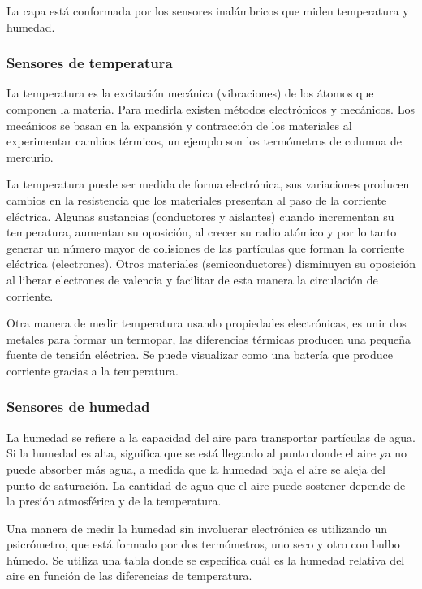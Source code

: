 		La capa está conformada por los sensores inalámbricos que miden temperatura y humedad.
		
		\subsubsection{Sensores de temperatura}
		
			La temperatura es la excitación mecánica (vibraciones) de los átomos que componen la materia. Para medirla existen métodos electrónicos y mecánicos. Los mecánicos se basan en la expansión y contracción de los materiales al experimentar cambios térmicos, un ejemplo son los termómetros de columna de mercurio.
		
			La temperatura puede ser medida de forma electrónica, sus variaciones producen cambios en la resistencia que los materiales presentan al paso de la corriente eléctrica. Algunas sustancias (conductores y aislantes) cuando incrementan su temperatura, aumentan su oposición, al crecer su radio atómico y por lo tanto generar un número mayor de colisiones de las partículas que forman la corriente eléctrica (electrones). Otros materiales (semiconductores) disminuyen su oposición al liberar electrones de valencia y facilitar de esta manera la circulación de corriente.
		
			Otra manera de medir temperatura usando propiedades electrónicas, es unir dos metales para formar un termopar, las diferencias térmicas producen una pequeña fuente de tensión eléctrica. Se puede visualizar como una batería que produce corriente gracias a la temperatura.
		
		\subsubsection{Sensores de humedad}
		
			La humedad se refiere a la capacidad del aire para transportar partículas de agua. Si la humedad es alta, significa que se está llegando al punto donde el aire ya no puede absorber más agua, a medida que la humedad baja el aire se aleja del punto de saturación. La cantidad de agua que el aire puede sostener depende de la presión atmosférica y de la temperatura.
		
			Una manera de medir la humedad sin involucrar electrónica es utilizando un psicrómetro, que está formado por dos termómetros, uno seco y otro con bulbo húmedo. Se utiliza una tabla donde se especifica cuál es la humedad relativa del aire en función de las diferencias de temperatura.
		
